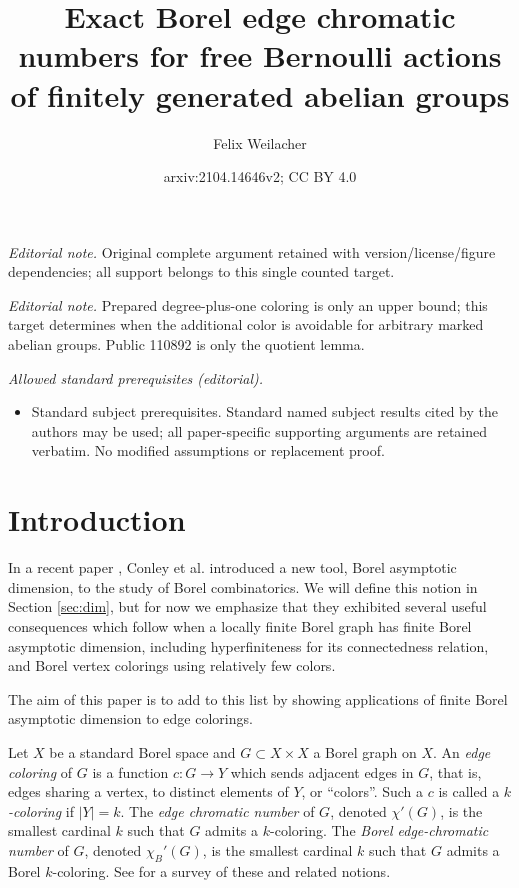 \documentclass[10pt,a4paper]{article}
\title{Exact Borel edge chromatic numbers for free Bernoulli actions of finitely generated abelian groups}
\author{Felix Weilacher}
\date{arxiv:2104.14646v2; CC BY 4.0}
\newcommand{\0}{\varnothing}
\begin{document}
\maketitle
\noindent\textit{Editorial note.} Original complete argument retained with version/license/figure dependencies; all support belongs to this single counted target.\par\medskip
\noindent\textit{Editorial note.} Prepared degree-plus-one coloring is only an upper bound; this target determines when the additional color is avoidable for arbitrary marked abelian groups. Public 110892 is only the quotient lemma.\par\medskip
\noindent\textit{Allowed standard prerequisites (editorial).}\begin{itemize}
\item Standard subject prerequisites. Standard named subject results cited by the authors may be used; all paper-specific supporting arguments are retained verbatim. No modified assumptions or replacement proof.
\end{itemize}\medskip
\section{Introduction}\label{sec:intro}


In a recent paper \cite{dim}, Conley et al. introduced a new tool, Borel asymptotic dimension, to the study of Borel combinatorics. We will define this notion in Section \ref{sec:dim}, but for now we emphasize that they exhibited several useful consequences which follow when a locally finite Borel graph has finite Borel asymptotic dimension, including hyperfiniteness for its connectedness relation, and Borel vertex colorings using relatively few colors. 

The aim of this paper is to add to this list by showing applications of finite Borel asymptotic dimension to edge colorings.

Let $X$ be a standard Borel space and $G \subset X \times X$ a Borel graph on $X$. An \textit{edge coloring} of $G$ is a function $c:G \rightarrow Y$ which sends adjacent edges in $G$, that is, edges sharing a vertex, to distinct elements of $Y$, or ``colors''. Such a $c$ is called a \textit{$k$-coloring} if $|Y| = k$. The \textit{edge chromatic number} of $G$, denoted $\chi'(G)$, is the smallest cardinal $k$ such that $G$ admits a $k$-coloring. The \textit{Borel edge-chromatic number} of $G$, denoted $\chi_B'(G)$, is the smallest cardinal $k$ such that $G$ admits a Borel $k$-coloring. See \cite{KM} for a survey of these and related notions.
\end{document}
